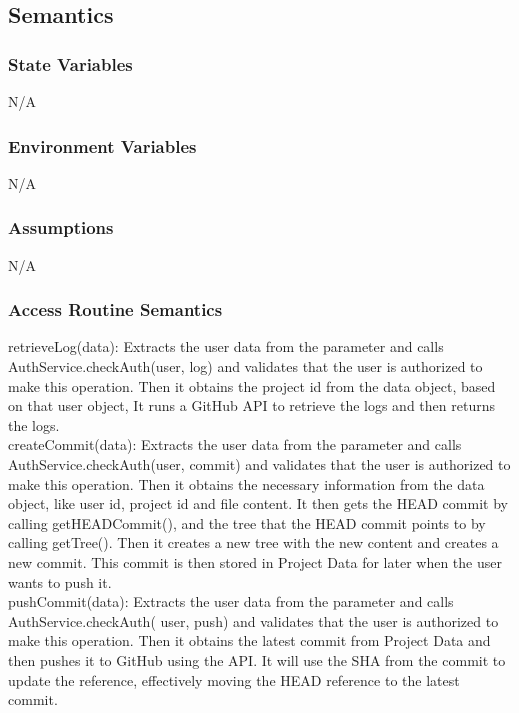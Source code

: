 \documentclass[12pt, titlepage]{article}
\begin{document}
	\subsection{Semantics}
	
	\subsubsection{State Variables}
	N/A
	
	\subsubsection{Environment Variables}
	N/A
	
	\subsubsection{Assumptions}
	N/A
	
	\subsubsection{Access Routine Semantics}
	
	\noindent retrieveLog(data): Extracts the user data from the parameter and calls AuthService.checkAuth(user, log) and validates that the user is authorized to make this operation. Then it obtains the project id from the data object, based on that user object, It runs a GitHub API to retrieve the logs and then returns the logs. \\
	
	\noindent createCommit(data): Extracts the user data from the parameter and calls AuthService.checkAuth(user, commit) and validates that the user is authorized to make this operation. Then it obtains the necessary information from the data object, like user id, project id and file content. It then gets the HEAD commit by calling getHEADCommit(), and the tree that the HEAD commit points to by calling getTree(). Then it creates a new tree with the new content and creates a new commit. This commit is then stored in Project Data for later when the user wants to push it.  \\
	
	\noindent pushCommit(data): Extracts the user data from the parameter and calls AuthService.checkAuth( user, push) and validates that the user is authorized to make this operation. Then it obtains the latest commit from Project Data and then pushes it to GitHub using the API. It will use the SHA from the commit to update the reference, effectively moving the HEAD reference to the latest commit. \\
	
\end{document}
